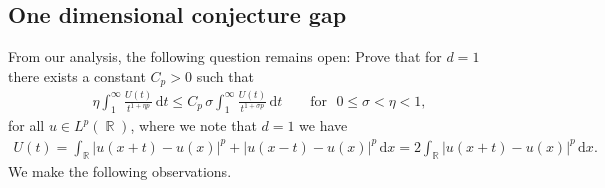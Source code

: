 \documentclass[12pt, reqno]{amsart}%
\theoremstyle{plain}  %
\theoremstyle{definition}  %
\theoremstyle{remark}
\numberwithin{equation}{section}
\DeclareMathOperator{\R}{\mathbb{R}}
\renewcommand{\d}{\,\mathrm{d}}
\begin{document}
\subsection{One dimensional conjecture gap}\label{sec:conjecture}
From our analysis, the following question remains open: Prove that for $d=1$ there exists a constant $C_p>0$ such that
\begin{align}\label{eq:desired-ineq}
\eta \int_1^\infty \frac{U(t)}{t^{1+\eta p}}\d t
\leq
C_p\, \sigma \int_1^\infty \frac{U(t)}{t^{1+\sigma p}}\d t
\qquad\text{for }\,\, 0\leq \sigma<\eta<1,
\end{align}
for all  $u\in L^p(\R)$, where we note that $d=1$ we have
\begin{align*}
U(t)=\int_{\R}|u(x+t)-u(x)|^p+ |u(x-t)-u(x)|^p \d x=2 \int_{\R}|u(x+t)-u(x)|^p\d x.
\end{align*}
We make the following observations.
\end{document}

